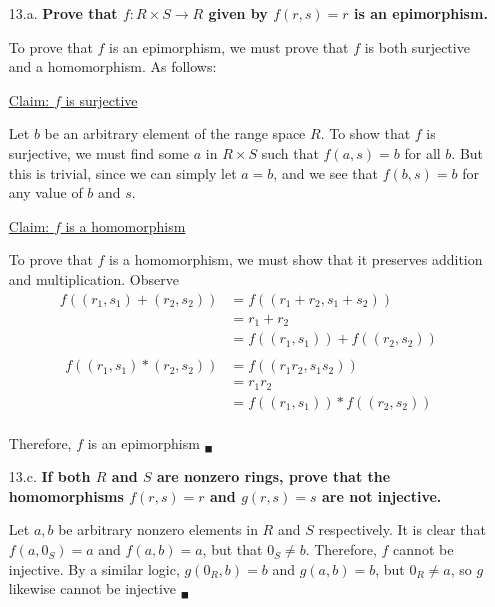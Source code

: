 \documentclass{article}
\begin{document}
\begin{enumerate}
		\item [13.a.] \textbf{Prove that $f:R \times S \rightarrow R$ given by $f(r, s) = r$ is an 
							  epimorphism.}

			To prove that $f$ is an epimorphism, we must prove that $f$ is both surjective and a
			homomorphism. As follows:

			\underline{Claim: $f$ is surjective}

			Let $b$ be an arbitrary element of the range space $R$. To show that $f$ is surjective, 
			we must find some $a$ in $R \times S$ such that $f(a, s) = b$ for all $b$. But this is
			trivial, since we can simply let $a = b$, and we see that $f(b, s) = b$ for any value 
			of $b$ and $s$. 

			\underline{Claim: $f$ is a homomorphism}

			To prove that $f$ is a homomorphism, we must show that it preserves addition and 
			multiplication. Observe
			\begin{align*}
				f((r_1, s_1) + (r_2, s_2)) & = f((r_1 + r_2, s_1 + s_2)) \\
										   & = r_1 + r_2 \\
										   & = f((r_1, s_1)) + f((r_2, s_2)) \\
			\end{align*}
			\begin{align*}
				f((r_1, s_1) * (r_2, s_2)) & = f((r_1r_2, s_1s_2)) \\
										   & = r_1r_2 \\
										   & = f((r_1, s_1)) * f((r_2, s_2)) \\
			\end{align*}

			Therefore, $f$ is an epimorphism $_{\blacksquare}$

		\item [13.c.] \textbf{If both $R$ and $S$ are nonzero rings, prove that the homomorphisms
							  $f(r, s) = r$ and $g(r, s) = s$ are not injective.}

			Let $a, b$ be arbitrary nonzero elements in $R$ and $S$ respectively. It is clear that 
			$f(a, 0_S) = a$ and $f(a, b) = a$, but that $0_S \neq b$. Therefore, $f$ cannot be 
			injective. By a similar logic, $g(0_R, b) = b$ and $g(a, b) = b$, but $0_R \neq a$, so
			$g$ likewise cannot be injective $_{\blacksquare}$


\end{enumerate}
\end{document}
